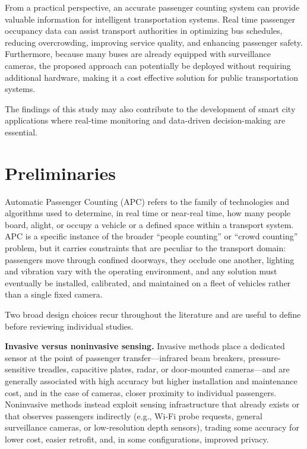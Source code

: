 \documentclass[12pt,a4paper]{report}
\begin{document}
From a practical perspective, an accurate passenger counting system can provide valuable information for intelligent transportation systems. Real time passenger occupancy data can assist transport authorities in optimizing bus schedules, reducing overcrowding, improving service quality, and enhancing passenger safety. Furthermore, because many buses are already equipped with surveillance cameras, the proposed approach can potentially be deployed without requiring additional hardware, making it a cost effective solution for public transportation systems.

The findings of this study may also contribute to the development of smart city applications where real-time monitoring and data-driven decision-making are essential.


\section{Preliminaries}

Automatic Passenger Counting (APC) refers to the family of technologies and algorithms used to determine, in real time or near-real time, how many people board, alight, or occupy a vehicle or a defined space within a transport system. APC is a specific instance of the broader ``people counting'' or ``crowd counting'' problem, but it carries constraints that are peculiar to the transport domain: passengers move through confined doorways, they occlude one another, lighting and vibration vary with the operating environment, and any solution must eventually be installed, calibrated, and maintained on a fleet of vehicles rather than a single fixed camera.

Two broad design choices recur throughout the literature and are useful to define before reviewing individual studies.

\textbf{Invasive versus noninvasive sensing.} Invasive methods place a dedicated sensor at the point of passenger transfer---infrared beam breakers, pressure-sensitive treadles, capacitive plates, radar, or door-mounted cameras---and are generally associated with high accuracy but higher installation and maintenance cost, and in the case of cameras, closer proximity to individual passengers. Noninvasive methods instead exploit sensing infrastructure that already exists or that observes passengers indirectly (e.g., Wi-Fi probe requests, general surveillance cameras, or low-resolution depth sensors), trading some accuracy for lower cost, easier retrofit, and, in some configurations, improved privacy.
\end{document}
